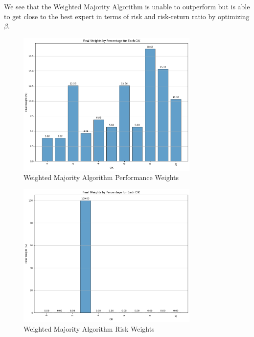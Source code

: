 \documentclass{article}
\begin{document}
We see that the Weighted Majority Algorithm is unable to outperform but is able to get close to the best expert in terms of risk and risk-return ratio by optimizing $\beta$.

    \begin{figure}[H]
    \centering
    \includegraphics[width=0.8\textwidth]{weighted_majority_final_weights.png}
    \caption{Weighted Majority Algorithm Performance Weights}
        \label{fig:weighted_majority_final_weights}
    \end{figure}

    \begin{figure}[H]
        \centering
        \includegraphics[width=0.8\textwidth]{weighted_majority_risk_final_weights.png}
        \caption{Weighted Majority Algorithm Risk Weights}
        \label{fig:weighted_majority_risk_final_weights}
    \end{figure}
\end{document}
